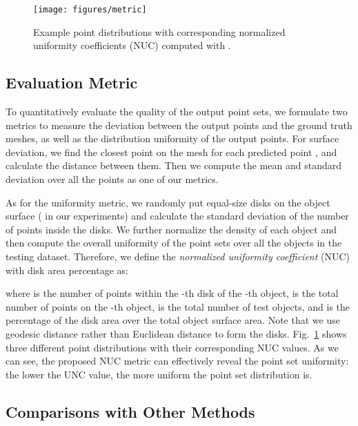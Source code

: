 \begin{figure}[!t]
	\centering
	\texttt{[image: figures/metric]}\vspace{1mm}
	\caption{Example point distributions with corresponding normalized uniformity coefficients (NUC) computed with .}
	\label{fig:metric}\vspace{-2mm}
\end{figure}



\subsection{Evaluation Metric}
\label{sec:metric}

To quantitatively evaluate the quality of the output point sets, we formulate two metrics to measure the deviation between the output points and the ground truth meshes, as well as the distribution uniformity of the output points.
For surface deviation, we find the closest point  on the mesh for each predicted point , and calculate the distance between them. 
Then we compute the mean and standard deviation over all the points as one of our metrics. 

As for the uniformity metric, we randomly put  equal-size disks on the object surface ( in our experiments) and calculate the standard deviation of the number of points inside the disks. We further normalize the density of each object and then compute the overall uniformity of the point sets over all the objects in the testing dataset.
Therefore, we define the \emph{normalized uniformity coefficient} (NUC) with disk area percentage  as:

where  is the number of points within the -th disk of the -th object,  is the total number of points on the -th object,  is the total number of test objects, and  is the percentage of the disk area over the total object surface area. 
Note that we use geodesic distance rather than Euclidean distance to form the disks.
Fig.~\ref{fig:metric} shows three different point distributions with their corresponding NUC values.
As we can see, the proposed NUC metric can effectively reveal the point set uniformity: the lower the UNC value, the more uniform the point set distribution is.



\subsection{Comparisons with Other Methods}
\label{sec:comparison}

